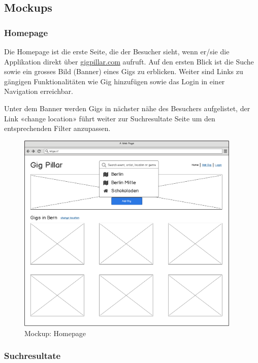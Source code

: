 \subsection{Mockups}

\subsubsection{Homepage}

Die Homepage ist die erste Seite, die der Besucher sieht, wenn er/sie die
Applikation direkt über \href{https://gigpillar.com/}{gigpillar.com} aufruft.
Auf den ersten Blick ist die Suche sowie ein grosses Bild (Banner) eines Gigs
zu erblicken. Weiter sind Links zu gängigen Funktionalitäten wie Gig hinzufügen
sowie das Login in einer Navigation erreichbar.

Unter dem Banner werden Gigs in nächster nähe des Besuchers aufgelistet, der
Link «change location» führt weiter zur Suchresultate Seite um den
entsprechenden Filter anzupassen.

\begin{figure}[!htb]
  \centering
  \includegraphics[width=0.95\textwidth]{mockups/homepage.png}
  \caption{Mockup: Homepage}
\end{figure}

\clearpage
\subsubsection{Suchresultate}

